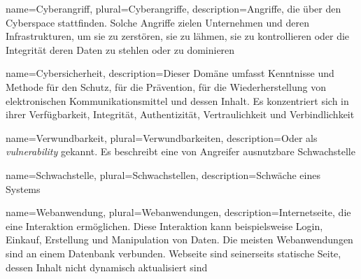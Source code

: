 


 {
    name={Cyberangriff},
    plural={Cyberangriffe},
    description={Angriffe, die über den Cyberspace stattfinden. Solche Angriffe zielen Unternehmen und deren Infrastrukturen, um sie zu zerstören, sie zu lähmen, sie zu kontrollieren oder die Integrität deren Daten zu stehlen oder zu dominieren \citep{NIST_Definitionen}}
}

 {
    name={Cybersicherheit},
    description={Dieser Domäne umfasst Kenntnisse und Methode für den Schutz, für die Prävention, für die Wiederherstellung von elektronischen Kommunikationsmittel und dessen Inhalt. Es konzentriert sich in ihrer Verfügbarkeit, Integrität, Authentizität, Vertraulichkeit und Verbindlichkeit \citep{NIST_Definitionen}}
}

 {
    name={Verwundbarkeit},
    plural={Verwundbarkeiten},
    description={Oder als \textit{vulnerability} gekannt. Es beschreibt eine von Angreifer ausnutzbare Schwachstelle \citep{Wendzel_It-Sicherheit}}
}

 {
    name={Schwachstelle},
    plural={Schwachstellen},
    description={Schwäche eines Systems \citep{Wendzel_It-Sicherheit}}
}

 {
    name={Webanwendung},
    plural={Webanwendungen},
    description={Internetseite, die eine Interaktion ermöglichen. Diese Interaktion kann beispielsweise Login, Einkauf, Erstellung und Manipulation von Daten. Die meisten Webanwendungen sind an einem Datenbank verbunden. Webseite sind seinerseits statische Seite, dessen Inhalt nicht dynamisch aktualisiert sind \citep{Essential_Desigs_Seite_x_Anwendung}}
}

